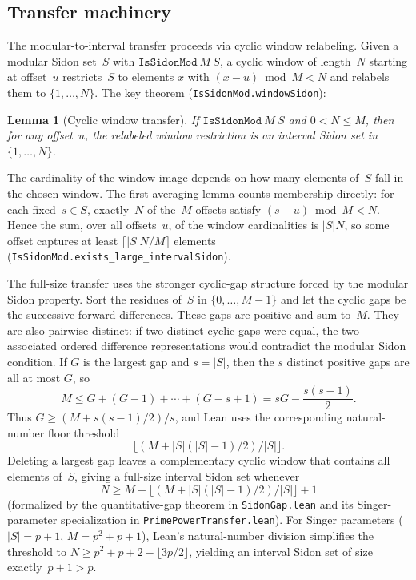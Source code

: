 \documentclass[11pt,a4paper]{article}
\newtheorem{lemma}[theorem]{Lemma}
\begin{document}
\subsection{Transfer machinery}

The modular-to-interval transfer proceeds via cyclic window relabeling.
Given a modular Sidon set~$S$ with $\mathtt{IsSidonMod}\ M\ S$, a cyclic
window of length~$N$ starting at offset~$u$ restricts~$S$ to elements
$x$ with $(x - u) \bmod M < N$ and relabels them to
$\{1,\dots,N\}$.  The key theorem (\texttt{IsSidonMod.windowSidon}):

\begin{lemma}[Cyclic window transfer]
If $\mathtt{IsSidonMod}\ M\ S$ and $0 < N \le M$, then for any offset~$u$,
the relabeled window restriction is an interval Sidon set in $\{1,\dots,N\}$.
\end{lemma}

The cardinality of the window image depends on how many elements of~$S$ fall
in the chosen window.  The first averaging lemma counts membership directly:
for each fixed~$s\in S$, exactly~$N$ of the~$M$ offsets satisfy
$(s-u)\bmod M<N$.  Hence the sum, over all offsets~$u$, of the window
cardinalities is $|S|N$, so some offset captures at least
$\lceil |S|N/M\rceil$ elements
(\texttt{IsSidonMod.exists\_large\_intervalSidon}).

The full-size transfer uses the stronger cyclic-gap structure forced by the
modular Sidon property.  Sort the residues of~$S$ in $\{0,\dots,M-1\}$ and let
the cyclic gaps be the successive forward differences.  These gaps are
positive and sum to~$M$.  They are also pairwise distinct: if two distinct
cyclic gaps were equal, the two associated ordered difference representations
would contradict
the modular Sidon condition.  If \(G\) is the largest gap and \(s=|S|\), then
the \(s\) distinct positive gaps are all at most \(G\), so
\[
  M \le G+(G-1)+\cdots+(G-s+1)
    = sG-\frac{s(s-1)}2 .
\]
Thus \(G\ge (M+s(s-1)/2)/s\), and Lean uses the corresponding
natural-number floor threshold
\[
  \lfloor(M+|S|(|S|-1)/2)/|S|\rfloor .
\]
Deleting a largest gap leaves a complementary cyclic window that contains all
elements of~\(S\), giving a full-size interval Sidon set whenever
\[
  N \ge M -
      \lfloor(M+|S|(|S|-1)/2)/|S|\rfloor + 1
\]
(formalized by the quantitative-gap theorem in \texttt{SidonGap.lean} and its
Singer-parameter specialization in \texttt{PrimePowerTransfer.lean}).
For Singer parameters ($|S| = p+1$, $M = p^2+p+1$), Lean's natural-number
division simplifies the threshold to
$N \ge p^2+p+2-\lfloor 3p/2 \rfloor$, yielding an interval Sidon set of
size exactly~$p+1 > p$.
\end{document}
